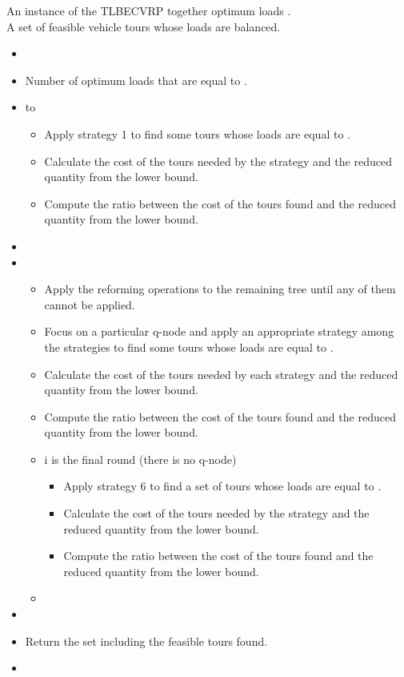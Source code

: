 \begin{algorithm}
\caption {} 
 An instance of the TLBECVRP together optimum loads .\\
 A set of feasible vehicle tours whose loads are balanced.
\begin{itemize}
\item[] 
\item[]   Number of optimum loads that are equal to .
\item[]   to  
\begin{itemize}
\item[] Apply strategy 1 to find some tours whose loads are equal to .
\item[] Calculate the cost of the tours needed by the strategy and the reduced quantity from the lower bound. 
\item[] Compute the ratio between the cost of the tours found and the reduced quantity from the lower bound.
\end{itemize}
\item[] 
\item[]   
\begin{itemize}
\item[] Apply the reforming operations to the remaining tree until any of them cannot be applied.
\item[] Focus on a particular q-node  and apply an appropriate strategy among the strategies  to find some tours whose loads are equal to .
\item[] Calculate the cost of the tours needed by each strategy and the reduced quantity from the lower bound. 
\item[] Compute the ratio between the cost of the tours found and the reduced quantity from the lower bound.
\item[]  i is the final round (there is no q-node) 
\begin{itemize}
\item[] Apply strategy 6 to find a set of tours whose loads are equal to .
\item[] Calculate the cost of the tours needed by the strategy and the reduced quantity from the lower bound. 
\item[] Compute the ratio between the cost of the tours found and the reduced quantity from the lower bound.
\end{itemize}
\item[]  
\end{itemize}
\item[] 
\item[] Return the set including the feasible tours found.
\item[] 
\end{itemize} 
\end{algorithm} 

